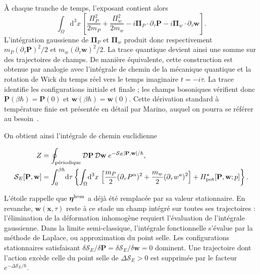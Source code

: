 À chaque tranche de temps, l'exposant contient alors
\begin{equation}
\int_\Omega\!\mathrm d^3x\,
\left[
\frac{\Pi_P^2}{2m_P}+\frac{\Pi_w^2}{2m_w}
-i\boldsymbol\Pi_P\!\cdot\partial_\tau\mathbf P
-i\boldsymbol\Pi_w\!\cdot\partial_\tau\mathbf w
\right].
\label{eq:core_phase_space_short_time}
\end{equation}
L'intégration gaussienne de $\boldsymbol\Pi_P$ et
$\boldsymbol\Pi_w$ produit donc respectivement
$m_P(\partial_\tau\mathbf P)^2/2$ et
$m_w(\partial_\tau\mathbf w)^2/2$. La trace quantique devient ainsi une somme
sur des trajectoires de champs. De manière équivalente, cette construction est obtenue
par analogie avec l'intégrale de chemin de la mécanique quantique et la rotation de Wick
 du temps réel vers le temps imaginaire
$t=-i\tau$. La trace identifie les configurations initiale et finale ; les
champs bosoniques vérifient donc
$\mathbf P(\beta\hbar)=\mathbf P(0)$ et
$\mathbf w(\beta\hbar)=\mathbf w(0)$. Cette dérivation standard à température
finie est présentée en détail par Marino, auquel on pourra se référer au
besoin~\cite[Sec.~5.8]{Marino2017}.

On obtient ainsi l'intégrale de chemin euclidienne
\begin{mdframed}[linecolor=red!60!black,nobreak=true]
\small
\begin{equation}
\begin{aligned}
Z&=\oint_{\text{périodique}}
\mathcal D\mathbf P\,\mathcal D\mathbf w\;
e^{-\mathcal S_E[\mathbf P,\mathbf w]/\hbar},\\
\mathcal S_E[\mathbf P,\mathbf w]
&=\int_0^{\beta\hbar}\!\mathrm d\tau
\left\{
\int_\Omega\!\mathrm d^3x\,
\left[\frac{m_P}{2}(\partial_\tau P^\alpha)^2
+\frac{m_w}{2}(\partial_\tau w^a)^2\right]
+H_{\rm pot}^{\star}[\mathbf P,\mathbf w;p]
\right\}.
\end{aligned}
\label{eq:core_quantum_action}
\end{equation}
\end{mdframed}
L'étoile rappelle que $\boldsymbol\eta^{\rm hom}$ a déjà été remplacée par sa
valeur stationnaire. En revanche, $\mathbf w(\mathbf x,\tau)$ reste à ce stade
un champ intégré sur toutes ses trajectoires : l'élimination de la déformation
inhomogène requiert l'évaluation de l'intégrale gaussienne.
Dans la limite semi-classique, l'intégrale
fonctionnelle s'évalue par la méthode de Laplace, ou approximation du
point selle. Les configurations stationnaires satisfaisant
$\delta\mathcal S_E/\delta\mathbf P=
\delta\mathcal S_E/\delta\mathbf w=0$ dominent. Une trajectoire dont l'action excède
celle du point selle de $\Delta\mathcal S_E>0$ est supprimée par le facteur
$e^{-\Delta\mathcal S_E/\hbar}$.

